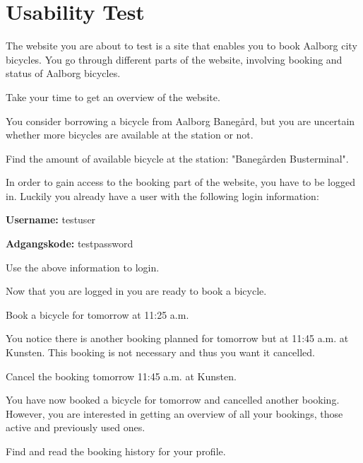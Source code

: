 \chapter{Usability Test}\label{app:usability-test}
	The website you are about to test is a site that enables you to book Aalborg city bicycles.
	You go through different parts of the website, involving booking and status of Aalborg bicycles.
	
	\begin{description}[style=nextline]
		\item[Establish an overview]
			Take your time to get an overview of the website.
		\item[Status for bicycle]
			You consider borrowing a bicycle from Aalborg Banegård, but you are uncertain whether more bicycles are available at the station or not.
		
			Find the amount of available bicycle at the station: "Banegården Busterminal".
		\item[Booking - Login]
			In order to gain access to the booking part of the website, you have to be logged in.
			Luckily you already have a user with the following login information:
			
			\textbf{Username:} testuser
			
			\textbf{Adgangskode:} testpassword
			
			Use the above information to login.
		\item[Booking - Time and booking]
			 Now that you are logged in you are ready to book a bicycle.
			 
			 Book a bicycle for tomorrow at 11:25 a.m.
		\item[Cancel planned booking]
			 You notice there is another booking planned for tomorrow but at 11:45 a.m. at Kunsten.
			 This booking is not necessary and thus you want it cancelled.
			 
			 Cancel the booking tomorrow 11:45 a.m. at Kunsten.
		\item[Examine the booking history]
			You have now booked a bicycle for tomorrow and cancelled another booking.
			However, you are interested in getting an overview of all your bookings, those active and previously used ones.
			
			Find and read the booking history for your profile.
	\end{description}